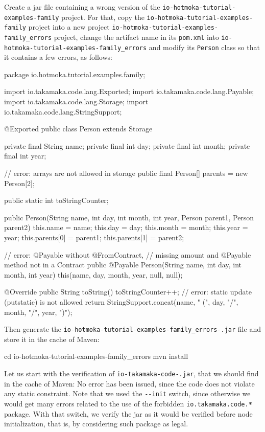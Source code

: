 Create a jar file containing
a wrong version of the \texttt{io-hotmoka-tutorial-examples-family} project.
For that, copy the \texttt{io-hotmoka-tutorial-examples-family}
project into a new project \texttt{io-hotmoka-tutorial-examples-family\_errors} project,
change the artifact name in its \texttt{pom.xml} into
\texttt{io-hotmoka-tutorial-examples-family\_errors} and modify
its \texttt{Person} class so that it contains a few errors, as follows:
%
\begin{codebox}\begin{javalst}
package io.hotmoka.tutorial.examples.family;

import io.takamaka.code.lang.Exported;
import io.takamaka.code.lang.Payable;
import io.takamaka.code.lang.Storage;
import io.takamaka.code.lang.StringSupport;

@Exported
public class Person extends Storage {
  private final String name;
  private final int day;
  private final int month;
  private final int year;

  // error: arrays are not allowed in storage
  public final Person[] parents = new Person[2];

  public static int toStringCounter;

  public Person(String name, int day, int month, int year, Person parent1, Person parent2) {
    this.name = name;
    this.day = day;
    this.month = month;
    this.year = year;
    this.parents[0] = parent1;
    this.parents[1] = parent2;
  }

  // error: @Payable without @FromContract,
  // missing amount and @Payable method not in a Contract
  public @Payable Person(String name, int day, int month, int year) {
    this(name, day, month, year, null, null);
  }

  @Override
  public String toString() {
    toStringCounter++; // error: static update (putstatic) is not allowed
    return StringSupport.concat(name, " (", day, "/", month, "/", year, ")");
  }
}
\end{javalst}\end{codebox}
%
Then generate the \texttt{io-hotmoka-tutorial-examples-family\_errors-\hotmokaVersion{}.jar} file and
store it in the cache of Maven:
%
\begin{shellcommandbox}\begin{ttlst}
cd io-hotmoka-tutorial-examples-family_errors
mvn install
\end{ttlst}\end{shellcommandbox}

Let us start with the verification of \texttt{io-takamaka-code-\takamakaVersion{}.jar},
that we should find in the cache of Maven:
%
%
No error has been issued, since the code does not violate any static constraint.
Note that we used the \texttt{-{}-init} switch, since otherwise we would get many errors
related to the use of the forbidden \texttt{io.takamaka.code.*} package. With that
switch, we verify the jar as it would be verified before node initialization,
that is, by considering such package as legal.

